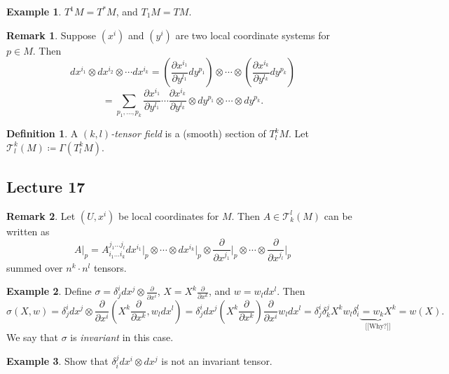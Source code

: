 \documentclass[10pt,letterpaper,cm]{nupset}
\theoremstyle{definition}
\newtheorem*{definition}{Definition}
\newtheorem{exmp}{Example}
\newtheorem{remark}{Remark}
\newcommand{\T}{\mathcal T}
\newcommand{\1}{\mathbf{1}}
\newcommand{\0}{\vec 0}
\begin{document}
\begin{exmp}
$T^1 M = T^{\ast}M$, and $T_1 M = TM$.
\end{exmp}

\begin{remark}
Suppose $(x^i)$ and $(y^i)$ are two local coordinate systems for $p\in M$. Then $$dx^{i_1} \otimes dx^{i_2} \otimes \cdots dx^{i_k} = (\frac{\partial{x^{i_1}}}{\partial{y^{l_1}}} dy^{p_1}) \otimes \cdots \otimes (\frac{\partial{x^{i_k}}}{\partial{y^{l_k}}} dy^{p_k})$$ $$ = \sum_{p_1, \ldots, p_k} \frac{\partial{x^{i_1}}}{\partial{y^{l_1}}}\cdots \frac{\partial{x^{i_k}}}{\partial{y^{l_k}}}  \otimes dy^{p_1} \otimes \cdots \otimes dy^{p_k}.$$
\end{remark}

\begin{definition}
A \textit{$(k, l)$-tensor field} is a (smooth) section of $T_l^kM$. Let $\T_l^k(M)\coloneqq  \Gamma(T_l^kM)$.
\end{definition}

\subsection{Lecture 17}

\begin{remark}
Let $(U, x^i)$ be local coordinates for $M$. Then $A \in \T_k^l(M)$ can be written as $$A\rvert_p = A_{i_1 \ldots i_k}^{j_1\ldots j_l} dx^{i_1}\rvert_p \otimes \cdots \otimes dx^{i_k}\rvert_p \otimes \frac{\partial}{\partial{x^{j_1}}}\rvert_p \otimes \cdots \otimes \frac{\partial}{\partial{x^{j_l}}}\rvert_p$$ summed over $n^k\cdot n^l$ tensors.
\end{remark}

\begin{exmp}
Define $\sigma = \delta_j^i dx^j \otimes \frac{\partial}{\partial{x^i}}$, $X = X^k \frac{\partial}{\partial{x^k}}$, and $w = w_ldx^l$. Then $$\sigma(X, w) = \delta_j^i dx^j \otimes \frac{\partial}{\partial{x^i}}(X^k \frac{\partial}{\partial{x^k}}, w_ldx^l) = \delta_j^i dx^j (X^k \frac{\partial}{\partial{x^k}}) \frac{\partial}{\partial{x^i}} w_ldx^l = \delta_j^i \delta_k^j X^k w_l\delta_i^l \underbrace{= w_kX^k}_{\text{[[Why?]]}} = w(X).$$ We say that $\sigma$ is \textit{invariant} in this case.
\end{exmp}

\begin{exmp}
Show that $\delta_i^j dx^i \otimes dx^j$ is not an invariant tensor. 
\end{exmp}
\end{document}
